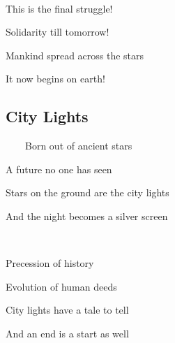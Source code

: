 \documentclass[11pt]{article}
\begin{document}
	\ 
	
	This is the final struggle!
	
	Solidarity till tomorrow!
	
	Mankind spread across the stars
	
	It now begins on earth!
	\newpage
	
	\subsection{City Lights}
	
	\ \ \ \ Born out of ancient stars
	
	A future no one has seen
	
	Stars on the ground are the city lights
	
	And the night becomes a silver screen
	
	\ 
	
	Precession of history
	
	Evolution of human deeds
	
	City lights have a tale to tell
	
	And an end is a start as well

	
\end{document}
